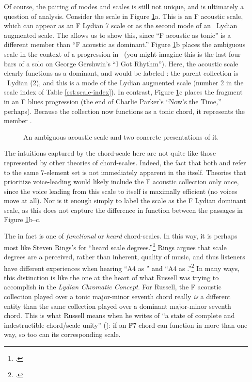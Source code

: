 Of course, the pairing of modes and scales is still not unique, and is
ultimately a question of analysis. Consider the scale in Figure
\ref{cst:ambiguous-acoustic}a. This is an F acoustic scale, which can appear
as an F Lydian \flat{}7 scale or as the second mode of an \Eflat\ Lydian
augmented scale. The \gis allows us to show this, since ``F
acoustic as tonic'' is a different \gis member than ``F acoustic as
dominant.'' Figure \ref{cst:ambiguous-acoustic}b places the ambiguous scale in
the context of a \tfo progression in \Bflat\ (you might imagine this is the
last four bars of a solo on George Gershwin's ``I Got Rhythm''). Here, the
acoustic scale clearly functions as a dominant, and would be labeled
: the parent collection is \Eflat\ Lydian
(2\flat), and this is a mode of the Lydian augmented scale (number 2 in the
scale index of Table \ref{cst:scale-index}). In contrast, Figure
\ref{cst:ambiguous-acoustic}c places the fragment in an F blues \tfo
progression (the end of Charlie Parker's ``Now's the Time,'' perhaps). Because
the collection now functions as a tonic chord, it represents the \gis member
.

\begin{figure}[tbp]
  \caption{An ambiguous acoustic scale and two concrete presentations of it.}
  \label{cst:ambiguous-acoustic}
\end{figure}

The intuitions captured by the chord-scale \gis here are not quite like those
represented by other theories of chord-scales. Indeed, the fact that both
 and  refer to
the same 7-element set is not immediately apparent in the \gis itself.
Theories that prioritize voice-leading would likely include the F acoustic
collection only once, since the voice leading from this scale to itself is
maximally efficient (no voices move at all). Nor is it enough simply to label
the scale as the F Lydian dominant scale, as this does not capture the
difference in function between the passages in Figure
\ref{cst:ambiguous-acoustic}b--c.

The \gis in fact is one of \emph{functional} or \emph{heard} chord-scales. In
this way, it is perhaps most like Steven Rings's \gis for ``heard scale
degrees.''\footcite[44--50 and throughout]{rings:2011} Rings argues that scale
degrees are a perceived, rather than inherent, quality of music, and thus
listeners have different experiences when hearing ``A4 as '' and ``A4 as
.''\footcite[42]{rings:2011} In many ways, this distinction is like the
one at the heart of what Russell was trying to accomplish in the \emph{Lydian
  Chromatic Concept}. For Russell, the F acoustic collection played over a
tonic major-minor seventh chord really \emph{is} a different entity than the
same collection played over a dominant major-minor seventh chord. This is what
Russell means when he writes of ``a state of complete and indestructible
chord/scale unity'' (): if an \h{F7} chord can function in more than
one way, so too can its corresponding scale.

